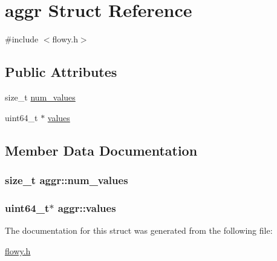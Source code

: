 \hypertarget{structaggr}{\section{aggr \-Struct \-Reference}
\label{structaggr}
}


{\ttfamily \#include $<$flowy.\-h$>$}

\subsection*{\-Public \-Attributes}
\begin{DoxyCompactItemize}
\item 
size\-\_\-t \hyperlink{structaggr_a257067fd827d52568c492e6d7faf4ca6}{num\-\_\-values}
\item 
uint64\-\_\-t $\ast$ \hyperlink{structaggr_adcae1b486f9b7225255857460fa6d35c}{values}
\end{DoxyCompactItemize}


\subsection{\-Member \-Data \-Documentation}
\hypertarget{structaggr_a257067fd827d52568c492e6d7faf4ca6}{
\subsubsection[{num\-\_\-values}]{\setlength{\rightskip}{0pt plus 5cm}size\-\_\-t {\bf aggr\-::num\-\_\-values}}}\label{structaggr_a257067fd827d52568c492e6d7faf4ca6}
\hypertarget{structaggr_adcae1b486f9b7225255857460fa6d35c}{
\subsubsection[{values}]{\setlength{\rightskip}{0pt plus 5cm}uint64\-\_\-t$\ast$ {\bf aggr\-::values}}}\label{structaggr_adcae1b486f9b7225255857460fa6d35c}


\-The documentation for this struct was generated from the following file\-:\begin{DoxyCompactItemize}
\item 
\hyperlink{flowy_8h}{flowy.\-h}\end{DoxyCompactItemize}
